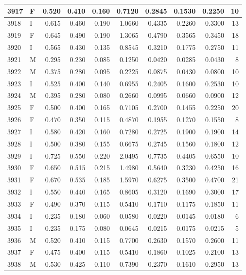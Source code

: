 \documentclass[9pt,twocolumn,twoside,]{pnas-new}
\begin{document}
\begin{tabular}{l|l|r|r|r|r|r|r|r|r}
\hline
3917 & F & 0.520 & 0.410 & 0.160 & 0.7120 & 0.2845 & 0.1530 & 0.2250 & 10\\
\hline
3918 & I & 0.615 & 0.460 & 0.190 & 1.0660 & 0.4335 & 0.2260 & 0.3300 & 13\\
\hline
3919 & F & 0.645 & 0.490 & 0.190 & 1.3065 & 0.4790 & 0.3565 & 0.3450 & 18\\
\hline
3920 & I & 0.565 & 0.430 & 0.135 & 0.8545 & 0.3210 & 0.1775 & 0.2750 & 11\\
\hline
3921 & M & 0.295 & 0.230 & 0.085 & 0.1250 & 0.0420 & 0.0285 & 0.0430 & 8\\
\hline
3922 & M & 0.375 & 0.280 & 0.095 & 0.2225 & 0.0875 & 0.0430 & 0.0800 & 10\\
\hline
3923 & I & 0.525 & 0.400 & 0.140 & 0.6955 & 0.2405 & 0.1600 & 0.2530 & 10\\
\hline
3924 & M & 0.395 & 0.280 & 0.080 & 0.2660 & 0.0995 & 0.0660 & 0.0900 & 12\\
\hline
3925 & F & 0.500 & 0.400 & 0.165 & 0.7105 & 0.2700 & 0.1455 & 0.2250 & 20\\
\hline
3926 & F & 0.470 & 0.350 & 0.115 & 0.4870 & 0.1955 & 0.1270 & 0.1550 & 8\\
\hline
3927 & I & 0.580 & 0.420 & 0.160 & 0.7280 & 0.2725 & 0.1900 & 0.1900 & 14\\
\hline
3928 & I & 0.500 & 0.380 & 0.155 & 0.6675 & 0.2745 & 0.1560 & 0.1800 & 12\\
\hline
3929 & I & 0.725 & 0.550 & 0.220 & 2.0495 & 0.7735 & 0.4405 & 0.6550 & 10\\
\hline
3930 & F & 0.650 & 0.515 & 0.215 & 1.4980 & 0.5640 & 0.3230 & 0.4250 & 16\\
\hline
3931 & F & 0.670 & 0.535 & 0.185 & 1.5970 & 0.6275 & 0.3500 & 0.4700 & 21\\
\hline
3932 & I & 0.550 & 0.440 & 0.165 & 0.8605 & 0.3120 & 0.1690 & 0.3000 & 17\\
\hline
3933 & F & 0.490 & 0.370 & 0.115 & 0.5410 & 0.1710 & 0.1175 & 0.1850 & 11\\
\hline
3934 & I & 0.235 & 0.180 & 0.060 & 0.0580 & 0.0220 & 0.0145 & 0.0180 & 6\\
\hline
3935 & I & 0.235 & 0.175 & 0.080 & 0.0645 & 0.0215 & 0.0175 & 0.0215 & 5\\
\hline
3936 & M & 0.520 & 0.410 & 0.115 & 0.7700 & 0.2630 & 0.1570 & 0.2600 & 11\\
\hline
3937 & F & 0.475 & 0.400 & 0.115 & 0.5410 & 0.1860 & 0.1025 & 0.2100 & 13\\
\hline
3938 & M & 0.530 & 0.425 & 0.110 & 0.7390 & 0.2370 & 0.1610 & 0.2950 & 13\\

\end{tabular}
\end{document}
